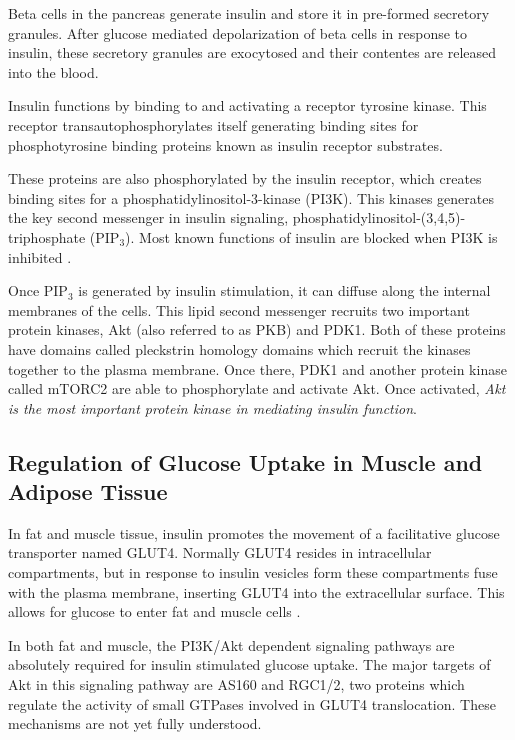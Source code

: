 \documentclass{tufte-handout}
\begin{document}
Beta cells in the pancreas generate insulin and store it in pre-formed secretory granules.  After glucose mediated depolarization of beta cells in response to insulin, these secretory granules are exocytosed and their contentes are released into the blood.

Insulin functions by binding to and activating a receptor tyrosine kinase.  This receptor transautophosphorylates itself generating binding sites for phosphotyrosine binding proteins known as insulin receptor substrates.

These proteins are also phosphorylated by the insulin receptor, which creates binding sites for a phosphatidylinositol-3-kinase (PI3K).  This kinases generates the key second messenger in insulin signaling, phosphatidylinositol-(3,4,5)-triphosphate (PIP$_3$).  Most known functions of insulin are blocked when PI3K is inhibited \cite{Kanai1993}.

Once PIP$_3$ is generated by insulin stimulation, it can diffuse along the internal membranes of the cells.  This lipid second messenger recruits two important protein kinases, Akt (also referred to as PKB) and PDK1.  Both of these proteins have domains called pleckstrin homology domains which recruit the kinases together to the plasma membrane.  Once there, PDK1 and another protein kinase called mTORC2 are able to phosphorylate and activate Akt.  Once activated, \emph{Akt is the most important protein kinase in mediating insulin function}.

\subsection{Regulation of Glucose Uptake in Muscle and Adipose Tissue}

In fat and muscle tissue, insulin promotes the movement of a facilitative glucose transporter named GLUT4.  Normally GLUT4 resides in intracellular compartments, but in response to insulin vesicles form these compartments fuse with the plasma membrane, inserting GLUT4 into the extracellular surface.  This allows for glucose to enter fat and muscle cells \cite{Leto2012}.

In both fat and muscle, the PI3K/Akt dependent signaling pathways are absolutely required for insulin stimulated glucose uptake.  The major targets of Akt in this signaling pathway are AS160 and RGC1/2, two proteins which regulate the activity of small GTPases involved in GLUT4 translocation.  These mechanisms are not yet fully understood.
\end{document}
